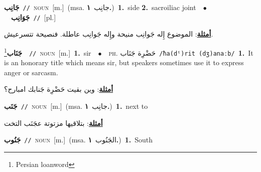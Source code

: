\documentclass[10pt,a4paper,twoside]{article} %
\begin{document}
\begin{multicols}{2}
{\setlength\topsep{0pt}\textbf{\foreignlanguage{arabic}{جَانِب}}\ {\color{gray}\texttt{//}\color{black}}\ \textsc{noun}\ [m.]\ \color{gray}(msa. \foreignlanguage{arabic}{جانِب}~\foreignlanguage{arabic}{\textbf{١.}})\color{black}\ \textbf{1.}~side  \textbf{2.}~sacroiliac joint\ \ $\bullet$\ \ \setlength\topsep{0pt}\textbf{\foreignlanguage{arabic}{جَوَانِب}}\ {\color{gray}\texttt{//}\color{black}}\ [pl.]\  \begin{flushright}\color{gray}\foreignlanguage{arabic}{\textbf{\underline{\foreignlanguage{arabic}{أمثلة}}}: الموضوع إِله جَوانِب منيحة وإِله جَوانِب عاطلة. فنصيحة تتسرعيش.}\end{flushright}\color{black}} \vspace{2mm}

{\setlength\topsep{0pt}\textbf{\foreignlanguage{arabic}{جَنَاب}}\footnote{Persian loanword}\ \ {\color{gray}\texttt{//}\color{black}}\ \textsc{noun}\ [m.]\ \textbf{1.}~sir\ \ $\bullet$\ \ \textsc{ph.} \color{gray} \foreignlanguage{arabic}{حَضْرِة جَنَاب}\color{black}\ {\color{gray}\texttt{/{\sffamily ħa(dˤ)rit (dʒ)anaːb}/}\color{black}}\ \textbf{1.}~It is an honorary title which means sir, but speakers sometimes use it to express anger or sarcasm.\  \begin{flushright}\color{gray}\foreignlanguage{arabic}{\textbf{\underline{\foreignlanguage{arabic}{أمثلة}}}: وين بقيت حَضْرِة جَنابك امبارح؟}\end{flushright}\color{black}} \vspace{2mm}

{\setlength\topsep{0pt}\textbf{\foreignlanguage{arabic}{جَنَب}}\ {\color{gray}\texttt{//}\color{black}}\ \textsc{noun}\ [m.]\ \color{gray}(msa. \foreignlanguage{arabic}{جانِب}~\foreignlanguage{arabic}{\textbf{١.}})\color{black}\ \textbf{1.}~next to\  \begin{flushright}\color{gray}\foreignlanguage{arabic}{\textbf{\underline{\foreignlanguage{arabic}{أمثلة}}}: بتلاقيها مزتوتة عجَنَب التخت}\end{flushright}\color{black}} \vspace{2mm}

{\setlength\topsep{0pt}\textbf{\foreignlanguage{arabic}{جَنُوب}}\ {\color{gray}\texttt{//}\color{black}}\ \textsc{noun}\ [m.]\ \color{gray}(msa. \foreignlanguage{arabic}{الجَنُوب}~\foreignlanguage{arabic}{\textbf{١.}})\color{black}\ \textbf{1.}~South\ } \vspace{2mm}


\end{multicols}
\end{document}

